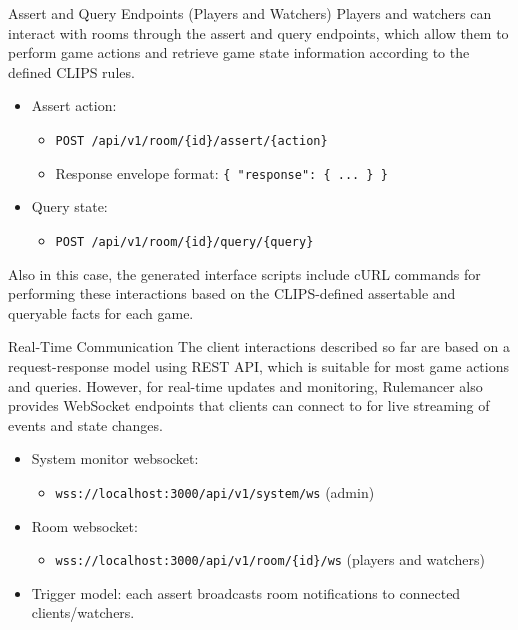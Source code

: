 \documentclass[aspectratio=169]{beamer}
\begin{document}
\begin{frame}{Assert and Query Endpoints (Players and Watchers)}
Players and watchers can interact with rooms through the assert and query endpoints,
which allow them to perform game actions and retrieve game state information according to the defined CLIPS rules. \\
\vspace{0.3cm}
\begin{itemize}
  \item Assert action:
  \begin{itemize}
    \item \texttt{POST /api/v1/room/\{id\}/assert/\{action\}}
    \item Response envelope format: \texttt{\{ "response": \{ ... \} \}}
  \end{itemize}
  \item Query state:
  \begin{itemize}
    \item \texttt{POST /api/v1/room/\{id\}/query/\{query\}}
  \end{itemize}
\end{itemize}
\vspace{0.3cm}
Also in this case, the generated interface scripts include cURL commands 
for performing these interactions based on the CLIPS-defined assertable and queryable facts for each game.
\end{frame}

\begin{frame}{Real-Time Communication}
The client interactions described so far are based on a request-response model using REST API,
which is suitable for most game actions and queries. However, for real-time updates and monitoring, 
Rulemancer also provides WebSocket endpoints that clients can connect to for live streaming of events
and state changes. \\
\vspace{0.3cm}
\begin{itemize}
  \item System monitor websocket:
  \begin{itemize}
    \item \texttt{wss://localhost:3000/api/v1/system/ws} (admin)
  \end{itemize}
  \item Room websocket:
  \begin{itemize}
    \item \texttt{wss://localhost:3000/api/v1/room/\{id\}/ws} (players and watchers)
  \end{itemize}
  \item Trigger model: each assert broadcasts room notifications to connected clients/watchers.
\end{itemize}
\end{frame}
\end{document}
